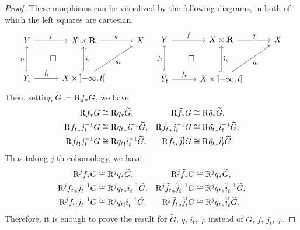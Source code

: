 \begin{proof}
  These morphisms can be visualized 
  by the following diagrams, in both of which the left squares are cartesian.
  \[
  \begin{tikzcd}[row sep=30pt, column sep=30pt]
    Y
      \arrow[r, "\tilde{f}"]
      \arrow[rd, phantom, "\square"]
    &
    X\times\rr
      \arrow[r, "q"]
    &
    X\\
    Y_{t}
      \arrow[u, hook, "j_t"]
      \arrow[r, "\hat{f}_{t}"]
    &
    X\times \openintvl{-\infty,t}
      \arrow[u, hook, "i_{t}"']
      \arrow[ur, "q_{t}"']
    &
  \end{tikzcd}
  \quad
  \begin{tikzcd}[row sep=30pt, column sep=30pt]
    Y
      \arrow[r, "\tilde{f}"]
      \arrow[rd, phantom, "\square"]
    &
    X\times\rr
      \arrow[r, "q"]
    &
    X\\
    \widetilde{Y}_{t}
      \arrow[u, hook, "\tilde{j}_t"]
      \arrow[r, "\check{f}_{t}"]
    &
    X\times \lopenrclosedintvl{-\infty,t}
      \arrow[u, hook, "\tilde{i}_{t}"']
      \arrow[ur, "\tilde{q}_{t}"']
    &
  \end{tikzcd}
  \]
  Then, setting \(\widetilde{G}\coloneqq \Rder[]{f_{\ast}}G\), 
  we have \begin{align*}
    \Rder[]{f_{\ast}}G
    &\cong 
    \Rder[]{q_{\ast}}\widetilde{G},
    &
    \Rder[]{\tilde{f}_{\ast}}G
    &\cong 
    \Rder[]{\tilde{q}_{\ast}}\widetilde{G},
    \\
    \Rder[]{{f_{t}}_{\ast}}j_{t}^{-1}G
    &\cong 
    \Rder[]{{q_{t}}_{\ast}}i_{t}^{-1}\widetilde{G},
    &
    \Rder[]{\tilde{f_{t}}_{\ast}}\tilde{j}_{t}^{-1}G
    &\cong 
    \Rder[]{\tilde{q_{t}}_{\ast}}\tilde{i}_{t}^{-1}\widetilde{G},
    \\
    \Rder[]{{f_{t}}_{!}}j_{t}^{-1}G
    &\cong 
    \Rder[]{{q_{t}}_{!}}i_{t}^{-1}\widetilde{G},
    &
    \Rder[]{\tilde{f_{t}}_{\ast}}\tilde{j}_{t}^{!}G
    &\cong 
    \Rder[]{\tilde{q_{t}}_{\ast}}\tilde{i}_{t}^{!}\widetilde{G}.
  \end{align*}
  Thus taking \(j\)-th cohomology, we have\begin{align*}
    \Rder[j]{f_{\ast}}G
    &\cong 
    \Rder[j]{q_{\ast}}\widetilde{G},
    &
    \Rder[j]{\tilde{f}_{\ast}}G
    &\cong 
    \Rder[j]{\tilde{q}_{\ast}}\widetilde{G},
    \\
    \Rder[j]{{f_{t}}_{\ast}}j_{t}^{-1}G
    &\cong 
    \Rder[j]{{q_{t}}_{\ast}}i_{t}^{-1}\widetilde{G},
    &
    \Rder[j]{\tilde{f_{t}}_{\ast}}\tilde{j}_{t}^{-1}G
    &\cong 
    \Rder[j]{\tilde{q_{t}}_{\ast}}\tilde{i}_{t}^{-1}\widetilde{G},
    \\
    \Rder[j]{{f_{t}}_{!}}j_{t}^{-1}G
    &\cong 
    \Rder[j]{{q_{t}}_{!}}i_{t}^{-1}\widetilde{G},
    &
    \Rder[j]{\tilde{f_{t}}_{\ast}}\tilde{j}_{t}^{!}G
    &\cong 
    \Rder[j]{\tilde{q_{t}}_{\ast}}\tilde{i}_{t}^{!}\widetilde{G}.    
  \end{align*}
  Therefore, it is enough to prove the result for \(\widetilde{G}\), \(q\), \(i_t\), \(\tilde{\varphi}\) instead of \(G\), \(f\), \(j_t\), \(\varphi\). 


\end{proof}
